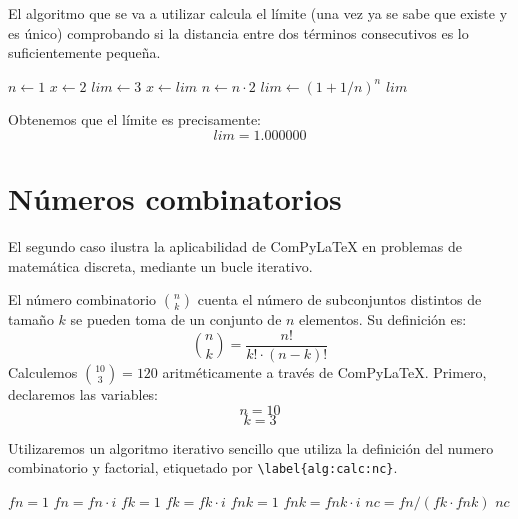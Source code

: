 \documentclass{book}
\begin{document}
El algoritmo que se va a utilizar calcula el límite (una vez ya se sabe que existe y es único) comprobando si la distancia entre dos términos consecutivos es lo suficientemente pequeña. 
\begin{algorithm}[H]
\caption{Aproximación numérica de $e = \lim_{n \to \infty}
\left(1 + \frac{1}{n}\right)^n$}
\label{alg:calc:lim}
\begin{algorithmic}
    \STATE $n \gets 1$
    \STATE $x \gets 2$ 
    \STATE $lim \gets 3$
        \STATE $x \gets lim$
        \STATE $n \gets n \cdot 2$
        \STATE $lim \gets (1 + 1/n)^n$
    \ENDWHILE
    \RETURN $lim$
\end{algorithmic}
\end{algorithm}

Obtenemos que el límite es precisamente:
\begin{equation}
    lim =
    1.000000
    \label{eq:res:lim}
\end{equation}

\section{Números combinatorios} \label{sec:combinatoria}
El segundo caso ilustra la aplicabilidad de ComPyLaTeX en problemas de matemática discreta, mediante un bucle iterativo.

El número combinatorio $\binom{n}{k}$ cuenta el número de subconjuntos distintos de tamaño
$k$ se pueden toma de un conjunto de $n$ elementos. Su definición es:
\[
    \binom{n}{k} = \frac{n!}{k! \cdot (n-k)!}
\]
Calculemos $\binom{10}{3} = 120$ aritméticamente a través de ComPyLaTeX. Primero, declaremos las variables:
\begin{equation}
    n = 10
    \label{eq:calc:n}
\end{equation}
\begin{equation}
    k = 3
    \label{eq:calc:k}
\end{equation}

Utilizaremos un algoritmo iterativo sencillo que utiliza la definición del numero combinatorio y factorial, etiquetado por \verb|\label{alg:calc:nc}|.

\begin{algorithm}
\caption{Cálculo de $\binom{n}{k}$ mediante factoriales iterativos}
\label{alg:calc:nc}
\begin{algorithmic}
    \STATE $fn = 1$
        \STATE $fn = fn \cdot i$ 
    \ENDFOR
    \STATE $fk = 1$
        \STATE $fk = fk \cdot i$ 
    \ENDFOR
    \STATE $fnk = 1$
        \STATE $fnk = fnk \cdot i$ 
    \ENDFOR
    \STATE $nc = fn / (fk \cdot fnk)$ 
    \RETURN $nc$
\end{algorithmic}
\end{algorithm}
\end{document}
